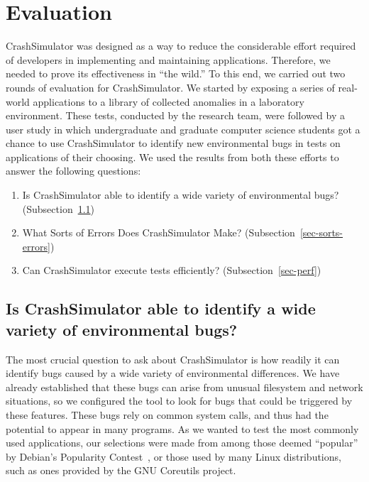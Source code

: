 \section{Evaluation}
\label{SEC:evaluation}

CrashSimulator was designed
as a way to reduce the considerable effort
required of developers
in implementing and maintaining applications.
Therefore,
we needed to prove its effectiveness in ``the wild.''
To this end,
we carried out two rounds of
evaluation for CrashSimulator.
We started by exposing
a series of real-world applications
to a library of collected anomalies in a laboratory environment.
These tests,
conducted by the research team,
were followed by a user study
in which undergraduate and graduate computer science students
got a chance to use CrashSimulator
to identify new environmental bugs
in tests on applications of their choosing.
We used the results from both these efforts
to answer the following questions:

\begin{enumerate}

\item{Is CrashSimulator able to identify a wide variety of environmental
    bugs?
(Subsection~\ref{sec-env-bugs})}

\item{What Sorts of Errors Does CrashSimulator Make?
    (Subsection~\ref{sec-sorts-errors})}

\item{Can CrashSimulator
      execute tests efficiently? (Subsection~\ref{sec-perf})}

\end{enumerate}

\subsection{Is CrashSimulator able to identify a wide variety of
environmental bugs?}
\label{sec-env-bugs}

The most crucial question to ask about CrashSimulator
is how readily it can
identify bugs
caused by a wide variety of environmental differences.
We have already established
that these bugs can arise from
unusual filesystem and network situations,
so we configured the tool to look
for bugs that could be triggered by these features.
These bugs rely on common system calls,
and thus had the potential to
appear in many programs.
As we wanted to test
the most commonly used applications,
our selections were made
from among those deemed ``popular''
by Debian's Popularity Contest~\cite{DebPopCon},
or those used
by many Linux distributions,
such as ones provided
by the GNU Coreutils project.

